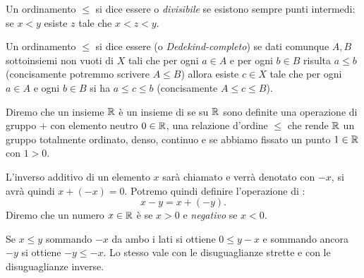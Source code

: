 
\begin{definition}
  Un ordinamento $\le$ si dice essere
   o \emph{divisibile} 
  se esistono sempre punti intermedi:
  se $x<y$ esiste $z$ tale che $x < z < y$.
\end{definition}
  
\begin{definition}
  Un ordinamento $\le$ si dice essere
  (o \emph{Dedekind-completo})
  se dati comunque $A,B$ sottoinsiemi non vuoti di $X$
    tali che per ogni $a\in A$ e per ogni $b\in B$ risulta $a\le b$
    (concisamente potremmo scrivere $A\le B$)
    allora esiste $c\in X$ tale che per ogni $a\in A$ e ogni $b\in B$ 
    si ha $a\le c \le b$ (concisamente $A\le c \le B$).
\end{definition}
  
\begin{definition}
  \label{def:reali}%
  \index{$\RR$}%
  Diremo che un insieme $\RR$ è un insieme di  
  se su $\RR$ sono definite una operazione di gruppo $+$ 
  con elemento neutro $0\in {\mathbb R}$, una relazione d'ordine $\le$ 
  che rende $\RR$ un gruppo totalmente ordinato, denso, continuo
  e se abbiamo fissato un punto $1\in {\mathbb R}$ con $1>0$.
\end{definition}

L'inverso additivo di un elemento $x$ sarà chiamato 
 e verrà denotato con $-x$, si avrà quindi $x + (-x) = 0$.
Potremo quindi definire l'operazione di :
\[
    x - y = x + (-y).
\]
Diremo che un numero $x\in {\mathbb R}$ è  
%
%
%
se $x>0$ e \emph{negativo} se $x<0$.

Se $x\le y$ sommando $-x$ da ambo i lati si ottiene 
$0 \le y-x$ e sommando ancora $-y$ si ottiene 
$-y \le -x$. Lo stesso vale con le disuguaglianze strette
e con le disuguaglianze inverse.

